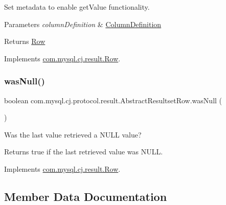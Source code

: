 Set metadata to enable get\+Value functionality.


\begin{DoxyParams}{Parameters}
{\em column\+Definition} & \mbox{\hyperlink{interfacecom_1_1mysql_1_1cj_1_1protocol_1_1_column_definition}{Column\+Definition}} \\
\hline
\end{DoxyParams}
\begin{DoxyReturn}{Returns}
\mbox{\hyperlink{}{Row}} 
\end{DoxyReturn}


Implements \mbox{\hyperlink{interfacecom_1_1mysql_1_1cj_1_1result_1_1_row_ab80b0f47123d2771840acead9bc094d0}{com.\+mysql.\+cj.\+result.\+Row}}.

\mbox{\label{classcom_1_1mysql_1_1cj_1_1protocol_1_1result_1_1_abstract_resultset_row_a9d1a54529c6a83e356e4d6bf079f8548}} 
\subsubsection{\texorpdfstring{was\+Null()}{wasNull()}}
{\footnotesize\ttfamily boolean com.\+mysql.\+cj.\+protocol.\+result.\+Abstract\+Resultset\+Row.\+was\+Null (\begin{DoxyParamCaption}{ }\end{DoxyParamCaption})}

Was the last value retrieved a N\+U\+LL value?

\begin{DoxyReturn}{Returns}
true if the last retrieved value was N\+U\+LL. 
\end{DoxyReturn}


Implements \mbox{\hyperlink{interfacecom_1_1mysql_1_1cj_1_1result_1_1_row_a6a915f3dfaf8f9997f705b7762f9c6cb}{com.\+mysql.\+cj.\+result.\+Row}}.



\subsection{Member Data Documentation}
\mbox{\label{classcom_1_1mysql_1_1cj_1_1protocol_1_1result_1_1_abstract_resultset_row_aa256b7951746cbcc3979d7474fa50c84}} 
